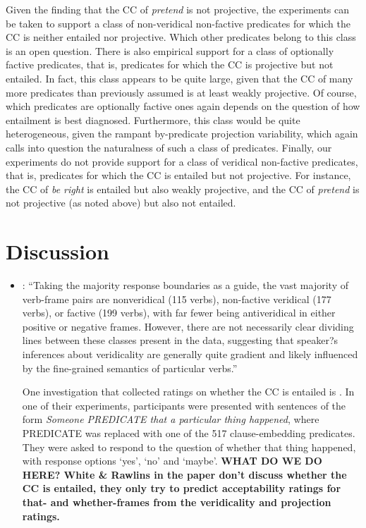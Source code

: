 \documentclass[11pt,fleqn]{article}
\newcommand{\6}{\mbox{$[\hspace*{-.6mm}[$}}
\newcommand{\9}{\mbox{$]\hspace*{-.6mm}]$}}
\begin{document}
{\begin{itemize}
Given the finding that the CC of {\em pretend} is not projective, the experiments can be taken to support a class of non-veridical non-factive predicates for which the CC is neither entailed nor projective. Which other predicates belong to this class is an open question. There is also empirical support for a class of optionally factive predicates, that is, predicates for which the CC is projective but not entailed. In fact, this class appears to be quite large, given that the CC of many more predicates than previously assumed is at least weakly projective. Of course, which predicates are optionally factive ones again depends on the question of how entailment is best diagnosed. Furthermore, this class would be quite heterogeneous, given the rampant by-predicate projection variability, which again calls into question the naturalness of such a class of predicates. Finally, our experiments do not provide support for a class of veridical non-factive predicates, that is, predicates for which the CC is entailed but not projective. For instance, the CC of {\em be right} is entailed but also weakly projective, and the CC of {\em pretend} is not projective (as noted above) but also not entailed. 

\end{itemize}

\newpage

\section{Discussion}\label{s4}

\begin{itemize}

\item \citet{white-rawlins-nels2018}: ``Taking the majority response boundaries as a guide, the vast majority of verb-frame pairs are nonveridical (115 verbs), non-factive veridical (177 verbs), or factive (199 verbs), with far fewer being antiveridical in either positive or negative frames. However, there are not necessarily clear dividing lines between these classes present in the data, suggesting that speaker?s inferences about veridicality are generally quite gradient and likely influenced by the fine-grained semantics of particular verbs.''

One investigation that collected ratings on whether the CC is entailed is \citealt{white-rawlins-nels2018}. In one of their experiments, participants were presented with sentences of the form {\em Someone PREDICATE that a particular thing happened}, where PREDICATE was replaced with one of the 517 clause-embedding predicates. They were asked to respond to the question of whether that thing happened, with response options `yes', `no' and `maybe'. {\bf WHAT DO WE DO HERE? White \& Rawlins in the paper don't discuss whether the CC is entailed, they only try to predict acceptability ratings for that- and whether-frames from the veridicality and projection ratings.}


\end{itemize}}
\end{document}
